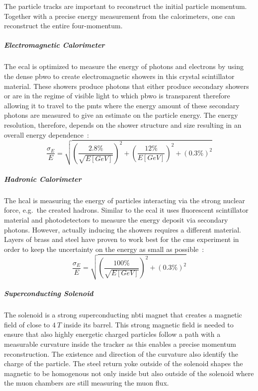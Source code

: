 The particle tracks are important to reconstruct the initial particle momentum. Together with a precise energy measurement from the calorimeters, one can reconstruct the entire four-momentum.~\cite{like-bf30}

\subparagraph{Electromagnetic Calorimeter}

The \gls{ecal} is optimized to measure the energy of photons and electrons by using the dense \gls{pbwo} to create electromagnetic showers in this crystal scintillator material. These showers produce photons that either produce secondary showers or are in the regime of visible light to which \gls{pbwo} is transparent therefore allowing it to travel to the \glspl{pmt} where the energy amount of these secondary photons are measured to give an estimate on the particle energy. The energy resolution, therefore, depends on the shower structure and size resulting in an overall energy dependence~\cite{like-eg21}:
\begin{equation}
    \frac{\sigma_E}E = \sqrt{{\left(\frac{2.8\%}{\sqrt{E[GeV]}}\right)}^2 + {\left(\frac{12\%}{{E[GeV]}}\right)}^2 + {\left(0.3\%\right)}^2}
\end{equation}

\subparagraph{Hadronic Calorimeter}

The \gls{hcal} is measuring the energy of particles interacting via the strong nuclear force, e.g.\ the created hadrons. Similar to the \gls{ecal} it uses fluorescent scintillator material and photodetectors to measure the energy deposit via secondary photons. However, actually inducing the showers requires a different material. Layers of brass and steel have proven to work best for the \gls{cms} experiment in order to keep the uncertainty on the energy as small as possible~\cite{like-eg22}:
\begin{equation}
    \frac{\sigma_E}E = \sqrt{
        {
            \left(
                \frac{100\%}{\sqrt{E[GeV]}}
            \right)
        }^2
    + {(0.3\%)}^2}
\end{equation}

\subparagraph{Superconducting Solenoid}

The solenoid is a strong superconducting \gls{nbti} magnet that creates a magnetic field of close to \(\SI{4}{T}\) inside its barrel. This strong magnetic field is needed to ensure that also highly energetic charged particles follow a path with a measurable curvature inside the tracker as this enables a precise momentum reconstruction. The existence and direction of the curvature also identify the charge of the particle. The steel return yoke outside of the solenoid shapes the magnetic to be homogenous not only inside but also outside of the solenoid where the muon chambers are still measuring the muon flux.~\cite{like-bf29}

